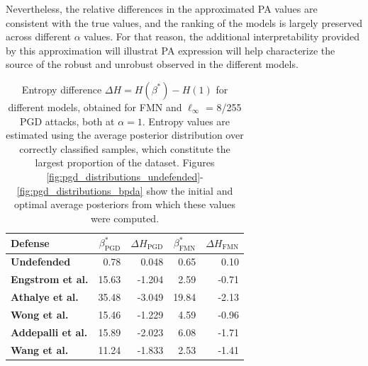 Nevertheless, the relative differences in the approximated PA values are consistent
with the true values, and the ranking of the models is largely preserved across different
$\alpha$ values. For that reason, the additional interpretability provided by this approximation
will illustrat PA expression will help characterize the source of the robust and unrobust
observed in the different models. \\

\begin{table}[t]
    \centering
        \begin{tabular}{l|rr|rr}
        Defense & $\beta^{*}_{\text{PGD}}$ & $\Delta H_{\text{PGD}}$  & $\beta^{*}_{\text{FMN}}$ & $\Delta H_{\text{FMN}}$ \\
        \midrule
        {\color{tab:orange} \textbf{Undefended}} & 0.78 & 0.048 & 0.65 & 0.10\\
        {\color{tab:blue} \textbf{Engstrom et al.}} & 15.63 & -1.204 & 2.59 & -0.71\\
        {\color{tab:green} \textbf{Athalye et al.}} & 35.48 & -3.049 & 19.84 & -2.13 \\
        {\color{tab:red} \textbf{Wong et al.}} & 15.46 & -1.229 & 4.59 & -0.96\\
        {\color{tab:purple} \textbf{Addepalli et al.}} & 15.89 & -2.023 & 6.08 & -1.71 \\
        {\color{tab:brown} \textbf{Wang et al.}} & 11.24 & -1.833 & 2.53 & -1.41\\
        \bottomrule
        \end{tabular}
        \caption{
        Entropy difference $\Delta H = H(\beta^{*}) - H(1)$
        for different models, obtained for FMN and $\ell_\infty$ = 8/255 
        PGD attacks, both at $\alpha = 1$. Entropy values are 
        estimated using the average posterior distribution over correctly classified
        samples, which constitute the largest proportion of the dataset.
        Figures \ref{fig:pgd_distributions_undefended}-\ref{fig:pgd_distributions_bpda}
        show the initial and optimal average posteriors from which these values
        were computed.
        }
        \label{tab:entropy_gibbs}
\end{table}

